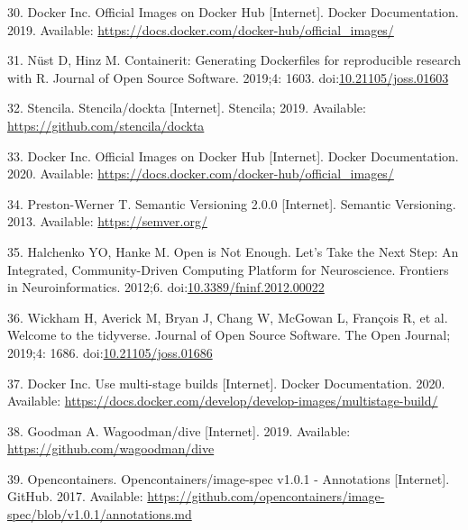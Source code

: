 \documentclass[10pt,letterpaper]{article}
\begin{document}
\leavevmode\hypertarget{ref-docker_inc_official_2019}{}%
30. Docker Inc. Official Images on Docker Hub {[}Internet{]}. Docker
Documentation. 2019. Available:
\url{https://docs.docker.com/docker-hub/official_images/}

\leavevmode\hypertarget{ref-nust_containerit_2019}{}%
31. Nüst D, Hinz M. Containerit: Generating Dockerfiles for reproducible
research with R. Journal of Open Source Software. 2019;4: 1603.
doi:\href{https://doi.org/10.21105/joss.01603}{10.21105/joss.01603}

\leavevmode\hypertarget{ref-stencila_dockta_2019}{}%
32. Stencila. Stencila/dockta {[}Internet{]}. Stencila; 2019. Available:
\url{https://github.com/stencila/dockta}

\leavevmode\hypertarget{ref-docker_inc_official_2020}{}%
33. Docker Inc. Official Images on Docker Hub {[}Internet{]}. Docker
Documentation. 2020. Available:
\url{https://docs.docker.com/docker-hub/official_images/}

\leavevmode\hypertarget{ref-preston-werner_semantic_2013}{}%
34. Preston-Werner T. Semantic Versioning 2.0.0 {[}Internet{]}. Semantic
Versioning. 2013. Available: \url{https://semver.org/}

\leavevmode\hypertarget{ref-halchenko_open_2012}{}%
35. Halchenko YO, Hanke M. Open is Not Enough. Let's Take the Next Step:
An Integrated, Community-Driven Computing Platform for Neuroscience.
Frontiers in Neuroinformatics. 2012;6.
doi:\href{https://doi.org/10.3389/fninf.2012.00022}{10.3389/fninf.2012.00022}

\leavevmode\hypertarget{ref-Wickham2019}{}%
36. Wickham H, Averick M, Bryan J, Chang W, McGowan L, François R, et
al. Welcome to the tidyverse. Journal of Open Source Software. The Open
Journal; 2019;4: 1686.
doi:\href{https://doi.org/10.21105/joss.01686}{10.21105/joss.01686}

\leavevmode\hypertarget{ref-docker_multi-stage_2020}{}%
37. Docker Inc. Use multi-stage builds {[}Internet{]}. Docker
Documentation. 2020. Available:
\url{https://docs.docker.com/develop/develop-images/multistage-build/}

\leavevmode\hypertarget{ref-goodman_dive_2019}{}%
38. Goodman A. Wagoodman/dive {[}Internet{]}. 2019. Available:
\url{https://github.com/wagoodman/dive}

\leavevmode\hypertarget{ref-opencontainers_image-spec_2017}{}%
39. Opencontainers. Opencontainers/image-spec v1.0.1 - Annotations
{[}Internet{]}. GitHub. 2017. Available:
\url{https://github.com/opencontainers/image-spec/blob/v1.0.1/annotations.md}
\end{document}
